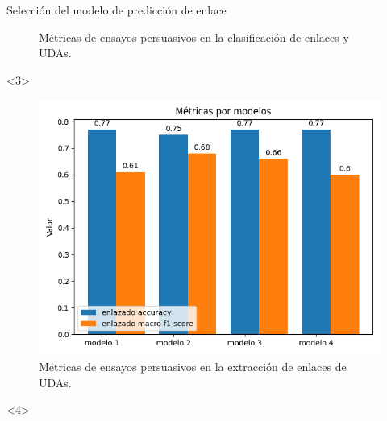 \documentclass{beamer}
\begin{document}
\begin{frame}{Selección del modelo de predicción de enlace}
\begin{onlyenv}
\begin{figure}
            \caption{Métricas de ensayos persuasivos en la clasificación de enlaces y UDAs.}
        \end{figure}
    \end{onlyenv}
    \begin{onlyenv}<3>
        \begin{figure}
            \includegraphics[scale=0.6]{Graphics/persuasive_essays_all_linked_all_relation_linked.png}
            \caption{Métricas de ensayos persuasivos en la extracción de enlaces de UDAs.}
        \end{figure}
    \end{onlyenv}
    \begin{onlyenv}<4>
        \begin{table}
            \begin{center}
\end{center}
\end{table}
\end{onlyenv}
\end{frame}
\end{document}
